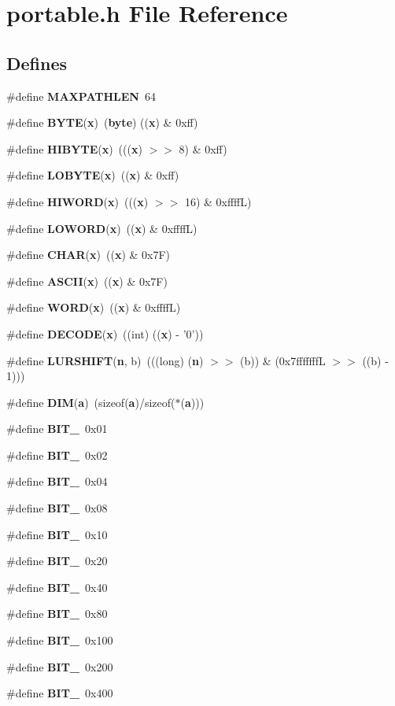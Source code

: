\section{portable.h File Reference}
\label{portable_8h}
\subsection*{Defines}
\begin{CompactItemize}
\item 
\#define {\bf MAXPATHLEN}\ 64
\item 
\#define {\bf BYTE}({\bf x})\ ({\bf byte}) (({\bf x}) \& 0xff)
\item 
\#define {\bf HIBYTE}({\bf x})\ ((({\bf x}) $>$$>$ 8) \& 0xff)
\item 
\#define {\bf LOBYTE}({\bf x})\ (({\bf x}) \& 0xff)
\item 
\#define {\bf HIWORD}({\bf x})\ ((({\bf x}) $>$$>$ 16) \& 0xffff\-L)
\item 
\#define {\bf LOWORD}({\bf x})\ (({\bf x}) \& 0xffff\-L)
\item 
\#define {\bf CHAR}({\bf x})\ (({\bf x}) \& 0x7F)
\item 
\#define {\bf ASCII}({\bf x})\ (({\bf x}) \& 0x7F)
\item 
\#define {\bf WORD}({\bf x})\ (({\bf x}) \& 0xffff\-L)
\item 
\#define {\bf DECODE}({\bf x})\ ((int) (({\bf x}) - '0'))
\item 
\#define {\bf LURSHIFT}({\bf n}, b)\ (((long) ({\bf n}) $>$$>$ (b)) \& (0x7fffffff\-L $>$$>$ ((b) - 1)))
\item 
\#define {\bf DIM}({\bf a})\ (sizeof({\bf a})/sizeof($\ast$({\bf a})))
\item 
\#define {\bf BIT\_}\ 0x01
\item 
\#define {\bf BIT\_}\ 0x02
\item 
\#define {\bf BIT\_}\ 0x04
\item 
\#define {\bf BIT\_}\ 0x08
\item 
\#define {\bf BIT\_}\ 0x10
\item 
\#define {\bf BIT\_}\ 0x20
\item 
\#define {\bf BIT\_}\ 0x40
\item 
\#define {\bf BIT\_}\ 0x80
\item 
\#define {\bf BIT\_}\ 0x100
\item 
\#define {\bf BIT\_}\ 0x200
\item 
\#define {\bf BIT\_}\ 0x400

\end{CompactItemize}
